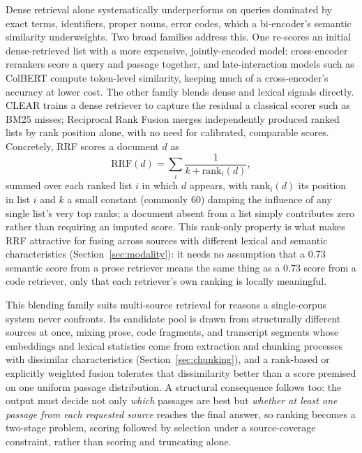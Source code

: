 \documentclass[conference]{IEEEtran}
\begin{document}
Dense retrieval alone systematically underperforms on queries dominated by exact terms, identifiers, proper nouns, error codes, which a bi-encoder's semantic similarity underweights. Two broad families address this. One re-scores an initial dense-retrieved list with a more expensive, jointly-encoded model: cross-encoder rerankers \cite{nogueira2019bert} score a query and passage together, and late-interaction models such as ColBERT \cite{khattab2020colbert} compute token-level similarity, keeping much of a cross-encoder's accuracy at lower cost. The other family blends dense and lexical signals directly. CLEAR \cite{gao2020clear} trains a dense retriever to capture the residual a classical scorer such as BM25 \cite{robertson2009bm25} misses; Reciprocal Rank Fusion \cite{cormack2009rrf} merges independently produced ranked lists by rank position alone, with no need for calibrated, comparable scores. Concretely, RRF scores a document $d$ as
\[
\mathrm{RRF}(d) = \sum_{i} \frac{1}{k + \mathrm{rank}_i(d)},
\]
summed over each ranked list $i$ in which $d$ appears, with $\mathrm{rank}_i(d)$ its position in list $i$ and $k$ a small constant (commonly 60) damping the influence of any single list's very top ranks; a document absent from a list simply contributes zero rather than requiring an imputed score. This rank-only property is what makes RRF attractive for fusing across sources with different lexical and semantic characteristics (Section~\ref{sec:modality}): it needs no assumption that a 0.73 semantic score from a prose retriever means the same thing as a 0.73 score from a code retriever, only that each retriever's own ranking is locally meaningful.

This blending family suits multi-source retrieval for reasons a single-corpus system never confronts. Its candidate pool is drawn from structurally different sources at once, mixing prose, code fragments, and transcript segments whose embeddings and lexical statistics come from extraction and chunking processes with dissimilar characteristics (Section~\ref{sec:chunking}), and a rank-based or explicitly weighted fusion tolerates that dissimilarity better than a score premised on one uniform passage distribution. A structural consequence follows too: the output must decide not only \emph{which} passages are best but \emph{whether at least one passage from each requested source} reaches the final answer, so ranking becomes a two-stage problem, scoring followed by selection under a source-coverage constraint, rather than scoring and truncating alone.
\end{document}
